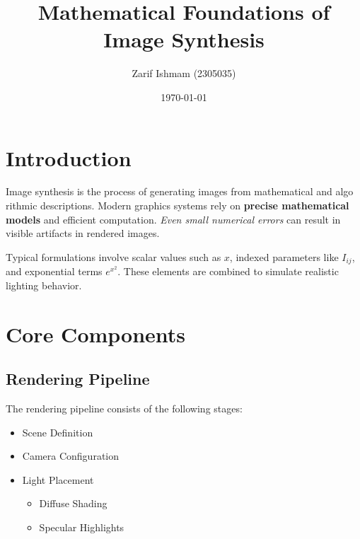 \documentclass{article}
\title{Mathematical Foundations of Image Synthesis}
\author{Zarif Ishmam (2305035)}
\date{\today}
\begin{document}
\maketitle

\section{Introduction}
Image synthesis is the process of generating images from mathematical and algo
rithmic descriptions. Modern graphics systems rely on \textbf{precise mathematical models} and efficient computation. \textit{Even small numerical errors} can result in visible artifacts in rendered images.


Typical formulations involve scalar values such as $x$, indexed parameters
like $I_{ij}$, and exponential terms $e^{x^2}$. These elements are combined to simulate realistic lighting behavior.

\section{Core Components}
\subsection{Rendering Pipeline}
The rendering pipeline consists of the following stages:
\begin{itemize}
    \item Scene Definition 
    \item Camera Configuration
    \item[-] Light Placement \\
    
    \noindent{}
        \begin{itemize}
            \item[-] Diffuse Shading
            \item[-] Specular Highlights
        \end{itemize}
\end{itemize}
\end{document}
